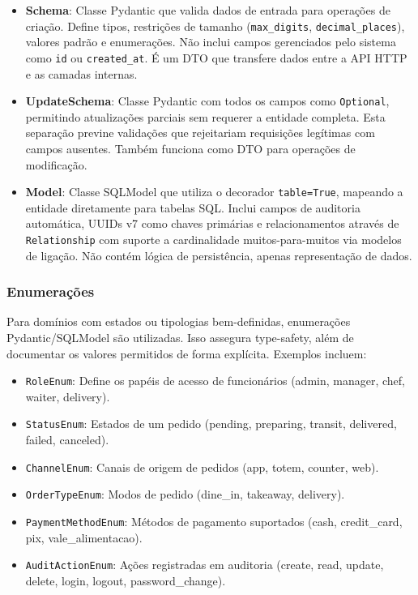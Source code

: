 \begin{itemize}
  \item \textbf{Schema}: Classe Pydantic que valida dados de entrada para operações de criação.
  Define tipos, restrições de tamanho (\texttt{max\_digits}, \texttt{decimal\_places}), valores padrão e enumerações.
  Não inclui campos gerenciados pelo sistema como \texttt{id} ou \texttt{created\_at}.
  É um DTO que transfere dados entre a API HTTP e as camadas internas.

  \item \textbf{UpdateSchema}: Classe Pydantic com todos os campos como \texttt{Optional},
  permitindo atualizações parciais sem requerer a entidade completa. Esta separação previne validações
  que rejeitariam requisições legítimas com campos ausentes. Também funciona como DTO para operações de modificação.

  \item \textbf{Model}: Classe SQLModel que utiliza o decorador \texttt{table=True}, mapeando a entidade diretamente para tabelas SQL.
  Inclui campos de auditoria automática, UUIDs v7 como chaves primárias e relacionamentos através de \texttt{Relationship} com suporte
  a cardinalidade muitos-para-muitos via modelos de ligação. Não contém lógica de persistência, apenas representação de dados.
\end{itemize}

\subsubsection{Enumerações}

\hspace{0.5cm} Para domínios com estados ou tipologias bem-definidas, enumerações Pydantic/SQLModel são utilizadas.
Isso assegura type-safety, além de documentar os valores permitidos de forma explícita. Exemplos incluem:

\begin{itemize}
  \item \texttt{RoleEnum}: Define os papéis de acesso de funcionários (admin, manager, chef, waiter, delivery).
  \item \texttt{StatusEnum}: Estados de um pedido (pending, preparing, transit, delivered, failed, canceled).
  \item \texttt{ChannelEnum}: Canais de origem de pedidos (app, totem, counter, web).
  \item \texttt{OrderTypeEnum}: Modos de pedido (dine\_in, takeaway, delivery).
  \item \texttt{PaymentMethodEnum}: Métodos de pagamento suportados (cash, credit\_card, pix, vale\_alimentacao).
  \item \texttt{AuditActionEnum}: Ações registradas em auditoria (create, read, update, delete, login, logout, password\_change).
\end{itemize}

